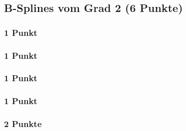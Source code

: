 \newif\ifvimbug
\vimbugfalse

\ifvimbug

\fi


\subsection{B-Splines vom Grad 2 (6 Punkte)}
\subsubsection{1 Punkt}

\subsubsection{1 Punkt}

\subsubsection{1 Punkt}

\subsubsection{1 Punkt}

\subsubsection{2 Punkte}